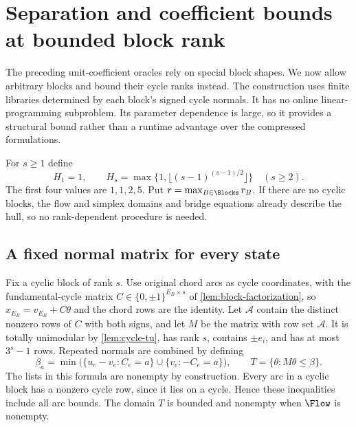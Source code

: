 \section{Separation and coefficient bounds at bounded block rank}\label{sec:bounded-rank}
The preceding unit-coefficient oracles rely on special block shapes. We now
allow arbitrary blocks and bound their cycle ranks instead. The construction
uses finite libraries determined by each block's signed cycle normals. It
has no online linear-programming subproblem. Its parameter dependence is
large, so it provides a structural bound rather than a runtime advantage
over the compressed formulations.

For $s\ge1$ define
\begin{equation}\label{eq:rank-coefficient-bound}
 H_1=1,\qquad
 H_s=\max\{1,\lfloor(s-1)^{(s-1)/2}\rfloor\}\quad(s\ge2).
\end{equation}
The first four values are $1,1,2,5$. Put $r=\max_{B\in\Blocks}r_B$.
If there are no cyclic blocks, the flow and simplex domains and bridge
equations already describe the hull, so no rank-dependent procedure is needed.

\subsection{A fixed normal matrix for every state}\label{subsec:rank-normal-matrix}
Fix a cyclic block of rank $s$. Use original chord arcs as cycle coordinates,
with the fundamental-cycle matrix $C\in\{0,\pm1\}^{E_B\times s}$ of
\cref{lem:block-factorization}, so
$x_{E_B}=v_{E_B}+C\theta$ and the chord rows are the identity.
Let $\mathcal A$ contain the distinct nonzero rows of $C$ with both signs,
and let $M$ be the matrix with row set $\mathcal A$. It is totally
unimodular by \cref{lem:cycle-tu}, has rank $s$, contains $\pm e_i$,
and has at most $3^s-1$ rows. Repeated normals are combined by defining
\begin{equation}\label{eq:rank-base-rhs}
 \beta_a=\min\bigl(\{u_e-v_e:C_e=a\}\cup
                    \{v_e:-C_e=a\}\bigr),\qquad
 T=\{\theta:M\theta\le\beta\}.
\end{equation}
The lists in this formula are nonempty by construction. Every arc in a
cyclic block has a nonzero cycle row, since it lies on a cycle. Hence
these inequalities include all arc bounds. The domain $T$ is bounded and
nonempty when $\Flow$ is nonempty.


